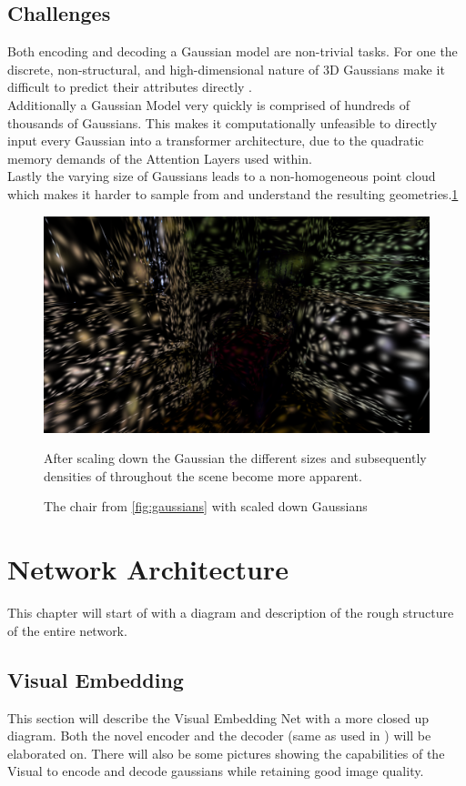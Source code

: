 \section{Challenges}
Both encoding and decoding a Gaussian model are non-trivial tasks. For one the discrete, non-structural, and high-dimensional nature of 3D Gaussians make it difficult to predict their attributes directly \cite{zou2023triplane}.\\
Additionally a Gaussian Model very quickly is comprised of hundreds of thousands of Gaussians. This makes it computationally unfeasible to directly input every Gaussian into a transformer architecture, due to the quadratic memory demands of the Attention Layers used within. \cite{beltagy2020longformer}\\
Lastly the varying size of Gaussians leads to a non-homogeneous point cloud which makes it harder to sample from and understand the resulting geometries.\ref{fig:chairshrunk}
\begin{figure}
\centering %
\includegraphics[width=0.6\linewidth]{Images/Chapter/chairshrunk.pdf} %
\caption{The chair from \ref{fig:gaussians} with scaled down Gaussians}\label{fig:chairshrunk}
After scaling down the Gaussian the different sizes and subsequently densities of throughout the scene become more apparent.
\end{figure}

\chapter{Network Architecture}
This chapter will start of with a diagram and description of the rough structure of the entire network.

\section{Visual Embedding}
This section will describe the Visual Embedding Net with a more closed up diagram. Both the novel encoder and the decoder (same as used in \cite{zou2023triplane}) will be elaborated on.
There will also be some pictures showing the capabilities of the Visual to encode and decode gaussians while retaining good image quality.

